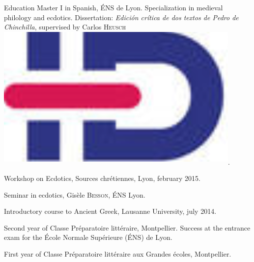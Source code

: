\begin{rubric}{Education}
                                \entry*[2014-2015]
                            Master I in Spanish, ÉNS de Lyon. Specialization in medieval philology
                        and ecdotics. Dissertation: \textit{Edición crítica de dos textos de Pedro de
                        Chinchilla}, supervised by Carlos
                        \textsc{Heusch}\href{https://www.idref.fr/055838413}{\textsuperscript{\includegraphics[scale=0.025]{img/idref.png}}}.
                    
                                \entry*
                            Workshop on Ecdotics, Sources chrétiennes, Lyon, february
                        2015.
                    
                                \entry*[2013-2014]
                            Seminar in ecdotics, Gisèle \textsc{Besson}, ÉNS
                        Lyon.
                    
                                \entry*
                            Introductory course to Ancient Greek, Lausanne University, july
                        2014.
                    
                                \entry*[2012-2013]
                            Second year of Classe Préparatoire littéraire, Montpellier. Success at
                        the entrance exam for the École Normale Supérieure (ÉNS) de Lyon.
                    
                                \entry*[2011-2012]
                            First year of Classe Préparatoire littéraire aux Grandes écoles,
                        Montpellier.
                    \end{rubric}





